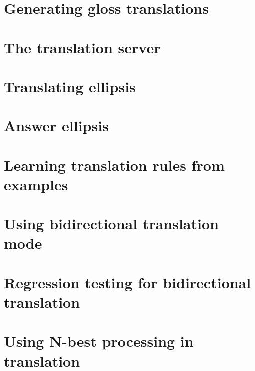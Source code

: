 \section{Generating gloss translations}
\label{Section:Gloss}

\section{The translation server}
\label{Section:TranslationServer}

\section{Translating ellipsis}
\label{Section:TranslationEllipsis}

\section{Answer ellipsis}
\label{Section:AnswerEllipsis}

\section{Learning translation rules from examples}
\label{Section:LearningTranslation}

\section{Using bidirectional translation mode}
\label{Section:Bidirectional}

\section{Regression testing for bidirectional translation}
\label{Section:RegressionBidirectional}

\section{Using N-best processing in translation}
\label{Section:TranslationNBest}

